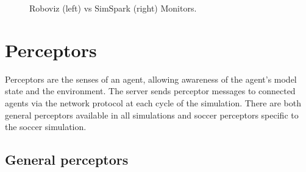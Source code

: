 \begin{figure}[t!] 
  \begin{center}
  \end{center}
  \caption{Roboviz (left) vs SimSpark (right) Monitors.}
  \label{fig:Roboviz}
\end{figure}





\section{Perceptors}
Perceptors are the senses of an agent, allowing awareness of the agent's model state and the environment.
The server sends perceptor messages to connected agents via the network protocol at each cycle of the simulation.
There are both general perceptors available in all simulations and soccer perceptors specific to the soccer simulation.



\subsection{General perceptors}

